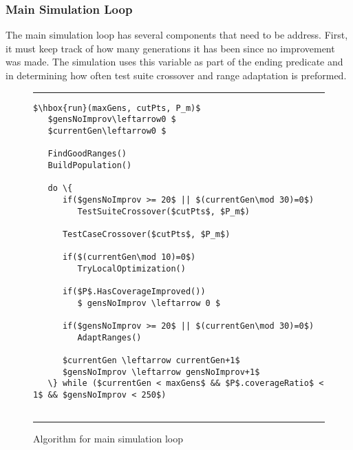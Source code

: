 \documentclass[runningheads]{llncs}
\begin{document}
\subsubsection{Main Simulation Loop}
The main simulation loop has several components that need to be address. First, it must keep track of how many generations it has been since no improvement was made. The simulation uses this variable as part of the ending predicate and in determining how often test suite crossover and range adaptation is preformed.
\begin{figure}[h!]
\begin{center}
\hrule
\medskip
\begin{Verbatim}[fontfamily=tt, xleftmargin=10pt, commandchars=\\\{\},
        codes={\catcode`$=3\catcode`^=7\catcode`_=8}]
$\hbox{run}(maxGens, cutPts, P_m)$
   $gensNoImprov\leftarrow0 $
   $currentGen\leftarrow0 $
   
   FindGoodRanges()
   BuildPopulation()
   
   do \{
      if($gensNoImprov >= 20$ || $(currentGen\mod 30)=0$)
         TestSuiteCrossover($cutPts$, $P_m$)

      TestCaseCrossover($cutPts$, $P_m$)
      
      if($(currentGen\mod 10)=0$)
         TryLocalOptimization()
         
      if($P$.HasCoverageImproved())
         $ gensNoImprov \leftarrow 0 $
         
      if($gensNoImprov >= 20$ || $(currentGen\mod 30)=0$)
         AdaptRanges()
         
      $currentGen \leftarrow currentGen+1$
      $gensNoImprov \leftarrow gensNoImprov+1$
   \} while ($currentGen < maxGens$ && $P$.coverageRatio$ < 1$ && $gensNoImprov < 250$)
   
\end{Verbatim}
\hrule
\end{center}
\caption{Algorithm for main simulation loop \label{fig:simLoop}}
\end{figure}
\end{document}
